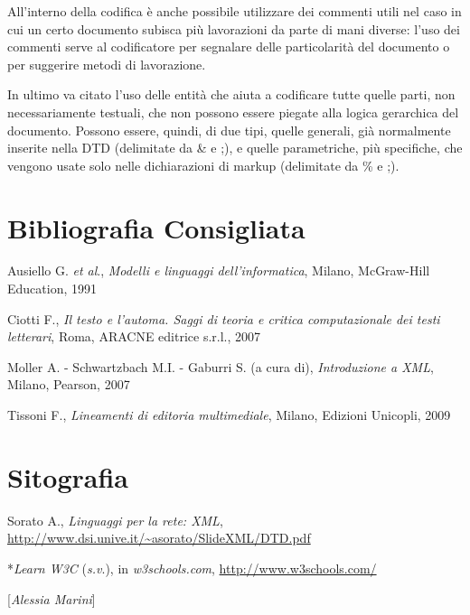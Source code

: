 All'interno della codifica è anche possibile utilizzare dei commenti
utili nel caso in cui un certo documento subisca più lavorazioni da
parte di mani diverse: l'uso dei commenti serve al codificatore per
segnalare delle particolarità del documento o per suggerire metodi di
lavorazione.

In ultimo va citato l'uso delle entità che aiuta a codificare tutte
quelle parti, non necessariamente testuali, che non possono essere
piegate alla logica gerarchica del documento. Possono essere, quindi, di
due tipi, quelle generali, già normalmente inserite nella DTD
(delimitate da \& e ;), e quelle parametriche, più specifiche, che
vengono usate solo nelle dichiarazioni di markup (delimitate da \% e ;).

\section*{Bibliografia Consigliata}
{\parindent0pt 
Ausiello G. \emph{et al}., \emph{Modelli e linguaggi dell'informatica},
Milano, McGraw-Hill Education, 1991

Ciotti F., \emph{Il testo e l'automa. Saggi di teoria e critica
computazionale dei testi letterari}, Roma, ARACNE editrice s.r.l., 2007

Moller A. - Schwartzbach M.I. - Gaburri S. (a cura di),
\emph{Introduzione a XML}, Milano, Pearson, 2007

Tissoni F., \emph{Lineamenti di editoria multimediale}, Milano, Edizioni
Unicopli, 2009

\section*{Sitografia}

Sorato A., \emph{Linguaggi per la rete: XML},
\url{http://www.dsi.unive.it/~asorato/SlideXML/DTD.pdf}

*\emph{Learn W3C} (\emph{s.v}.), in \emph{w3schools.com},
\url{http://www.w3schools.com/}
}

\hrulefill 

{[}\emph{Alessia Marini}{]}

